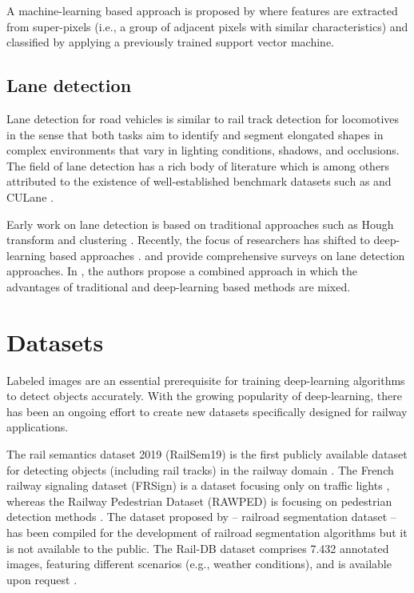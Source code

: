 \documentclass[Master,MDS,english]{BASE/twbook} %
\begin{document}
A machine-learning based approach is proposed by \cite{teng2016visual} where features are extracted from super-pixels (i.e., a group of adjacent pixels with similar characteristics) and classified by applying a previously trained support vector machine.


\section{Lane detection} \label{sec:lane_detection}

Lane detection for road vehicles is similar to rail track detection for locomotives in the sense that both tasks aim to identify and segment elongated shapes in complex environments that vary in lighting conditions, shadows, and occlusions. 
The field of lane detection has a rich body of literature which is among others attributed to the existence of well-established benchmark datasets such as \cite{TuSimple} and CULane \citep{pan2018SCNN}. 

Early work on lane detection is based on traditional approaches such as Hough transform and clustering \citep{10.1145/361237.361242, 5432669}. Recently, the focus of researchers has shifted to deep-learning based approaches \citep{meyer2021yolino, zheng2022clrnet, wang2022keypoint}.
\cite{tang2021review} and \cite{yang2023lane} provide comprehensive surveys on lane detection approaches. In \citep{yang2023lane}, the authors propose a combined approach in which the advantages of traditional and deep-learning based methods are mixed.


\chapter{Datasets} %

Labeled images are an essential prerequisite for training deep-learning algorithms to detect objects accurately.
With the growing popularity of deep-learning, there has been an ongoing effort to create new datasets specifically designed for railway applications.

The rail semantics dataset 2019 (RailSem19) is the first publicly available
dataset for detecting objects (including rail tracks) in the railway domain \citep{9025646}. 
The French railway signaling dataset (FRSign) is a dataset focusing only on traffic lights \citep{9025646}, whereas the Railway Pedestrian Dataset (RAWPED) is focusing on pedestrian detection methods \citep{9050835}. The dataset proposed by \cite{8859360} -- railroad segmentation dataset -- has been compiled for the development of railroad segmentation algorithms but it is not available to the public. The Rail-DB dataset comprises 7.432 annotated images, featuring different scenarios (e.g., weather conditions), and is available upon request \citep{10.1145/3503161.3548050}.  
\end{document}
